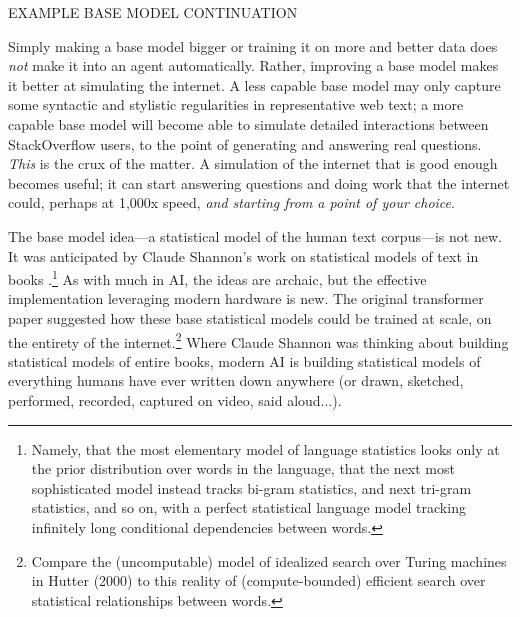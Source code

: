 EXAMPLE BASE MODEL CONTINUATION

Simply making a base model bigger or training it on more and better data does
\emph{not} make it into an agent automatically. Rather, improving a base model
makes it better at simulating the internet. A less capable base model may only
capture some syntactic and stylistic regularities in representative web text; a
more capable base model will become able to simulate detailed interactions
between StackOverflow users, to the point of generating and answering real
questions. \emph{This} is the crux of the matter. A simulation of the internet
that is good enough becomes useful; it can start answering questions and doing
work that the internet could, perhaps at 1,000x speed, \emph{and starting from
a point of your choice}.

The base model idea---a statistical model of the human text corpus---is not
new. It was anticipated by Claude Shannon's work on statistical models of text
in books \cite{shannon1951english}.\footnote{Namely, that the most elementary
model of language statistics looks only at the prior distribution over words in
the language, that the next most sophisticated model instead tracks bi-gram
statistics, and next tri-gram statistics, and so on, with a perfect statistical
language model tracking infinitely long conditional dependencies between
words.} As with much in AI, the ideas are archaic, but the effective
implementation leveraging modern hardware is new. The original transformer
paper suggested how these base statistical models could be trained at scale, on
the entirety of the internet.\footnote{Compare the (uncomputable) model of
idealized search over Turing machines in Hutter (2000) \cite{hutter2000aixi} to
this reality of (compute-bounded) efficient search over statistical
relationships between words.} Where Claude Shannon was thinking about building
statistical models of entire books, modern AI is building statistical models of
everything humans have ever written down anywhere (or drawn, sketched,
performed, recorded, captured on video, said aloud...).


